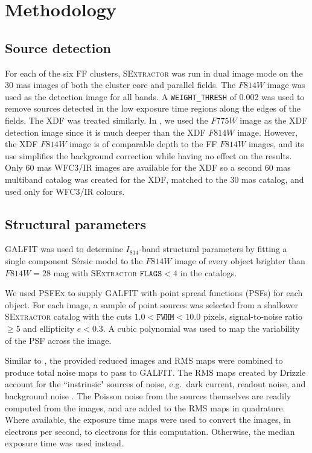 \documentclass[iop,tighten,twocolumn,apj,floatfix]{emulateapj}
\begin{document}
\section{Methodology}\label{sec:methodology}

\subsection{Source detection}

For each of the six FF clusters, \textsc{SExtractor} \citep{bertin1996} was run
in dual image mode on the 30 mas images of both the cluster core and parallel
fields. The $F814W$ image was used as the detection image for all bands.
A \texttt{WEIGHT\_THRESH} of 0.002 was used to remove sources detected in the
low exposure time regions along the edges of the fields.
The XDF was treated similarly.
In \cite{janssens2017}, we used the $F775W$ image as the XDF detection image
since it is much deeper than the XDF $F814W$ image. However, the XDF $F814W$ image
is of comparable depth to the FF $F814W$ images, and its use simplifies the
background correction while having no effect on the results.
Only 60 mas WFC3/IR images are available for the XDF so a second 60 mas multiband
catalog was created for the XDF, matched to the 30 mas catalog, and used only
for WFC3/IR colours.

\subsection{Structural parameters}\label{sec:galfit}

GALFIT \citep{peng2002} was used to determine $I_{814}$-band structural parameters
by fitting a single component S\'{e}rsic model to the $F814W$ image of every
object brighter than $F814W = 28$ mag with \textsc{SExtractor} $\mathtt{FLAGS}
< 4$ in the catalogs.

We used \textsc{PSFEx} \citep{bertin2011} to supply GALFIT with point spread
functions (PSFs) for each object. For each image, a sample of point sources
was selected from a shallower \textsc{SExtractor} catalog with the cuts $1.0 <
\mathtt{FWHM} < 10.0$ pixels, signal-to-noise ratio $\geq 5$ and ellipticity $e < 0.3$.
A cubic polynomial was used to map the variability of the PSF across the
image.

Similar to \cite{vanderwel2012}, the provided reduced images and RMS maps were
combined to produce total noise maps to pass to GALFIT. The RMS maps created
by Drizzle account for the ``instrinsic" sources of noise, e.g.\ dark current,
readout noise, and background noise \citep{koekemoer2011}. The Poisson noise
from the sources themselves are readily computed from the images, and are
added to the RMS maps in quadrature.  Where available, the exposure time maps
were used to convert the images, in electrons per second, to electrons for
this computation. Otherwise, the median exposure time was used instead.
\end{document}
